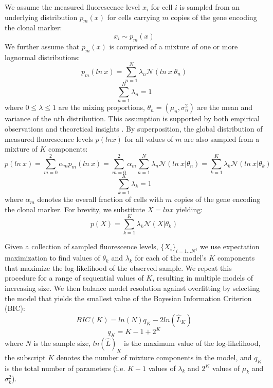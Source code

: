 We assume the measured fluorescence level $x_i$ for cell $i$ is sampled from an underlying distribution $p_m(x)$ for cells carrying $m$ copies of the gene encoding the clonal marker:
\begin{equation}
x_i \sim p_m(x)
\end{equation}
We further assume that $p_m(x)$ is comprised of a mixture of one or more lognormal distributions:
\begin{equation}
p_m(ln\ x) = \sum^{N}_{n=1}\lambda_n \mathcal{N}(ln\ x|\theta_{n})
\end{equation}
\begin{equation}
\sum^{N}_{n=1}\lambda_n=1
\end{equation}
where $0 \leq \lambda \leq 1$ are the mixing proportions, $\theta_n=(\mu_n,\sigma_n^2)$ are the mean and variance of the $n$th distribution. This assumption is supported by both empirical observations and theoretical insights \cite{Furusawa2005,Beal2017}. By superposition, the global distribution of measured fluorescence levels $p(ln x)$ for all values of $m$ are also sampled from a mixture of $K$ components:
\begin{equation}
p(ln\ x) =  \sum^{2}_{m=0} \alpha_m p_m(ln\ x) = \sum^{2}_{m=0} \alpha_m 
\sum^{N}_{n=1}\lambda_n \mathcal{N}(ln\ x|\theta_{n}) = \sum^{K}_{k=1}\lambda_k \mathcal{N}(ln\ x|\theta_{k})
\end{equation}
\begin{equation}
\sum^{K}_{k=1}\lambda_k=1
\end{equation}
where $\alpha_m$ denotes the overall fraction of cells with $m$ copies of the gene encoding the clonal marker. For brevity, we substitute $X = ln x$ yielding:
\begin{equation}
p(X) = \sum^{K}_{k=1}\lambda_k \mathcal{N}(X|\theta_{k})
\end{equation}

Given a collection of sampled fluorescence levels, $\{X_i\}_{i=1 \ldots N}$, we use expectation maximization to find values of $\theta_k$ and $\lambda_k$ for each of the model's $K$ components that maximize the log-likelihood of the observed sample. We repeat this procedure for a range of sequential values of $K$, resulting in multiple models of increasing size. We then balance model resolution against overfitting by selecting the model that yields the smallest value of the Bayesian Information Criterion (BIC):
\begin{equation}
BIC(K) = ln(N)q_K - 2 ln(\hat{L}_K)
\end{equation}
\begin{equation}
q_K = K-1 + 2^K
\end{equation}
where $N$ is the sample size, $ln(\hat{L})_K$ is the maximum value of the log-likelihood, the subscript $K$ denotes the number of mixture components in the model, and $q_K$ is the total number of parameters (i.e. $K-1$ values of $\lambda_k$ and $2^K$ values of $\mu_k$ and $\sigma_k^2$).

